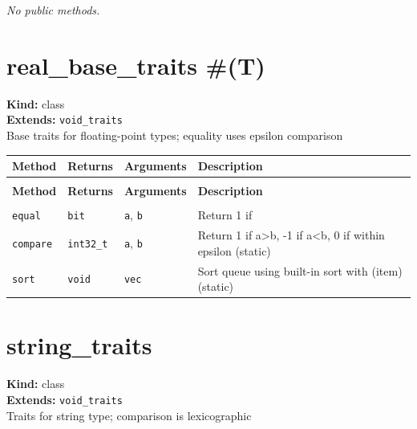 \documentclass[11pt,letterpaper]{report}
\begin{document}
\noindent\textit{No public methods.}


\section{real\_base\_traits \#(T)}
\label{cls:realbasetraitsT}

\noindent\textbf{Kind:} class\\
\noindent\textbf{Extends:} \texttt{void\_traits}\\
\noindent Base traits for floating-point types; equality uses epsilon comparison

\begin{xltabular}{\linewidth}{>{\small}p{1.35in} >{\small}p{1.25in} >{\small}p{0.95in} >{\small}X}
\toprule
\textbf{Method} & \textbf{Returns} & \textbf{Arguments} & \textbf{Description} \\
\midrule
\endfirsthead
{} \\
\midrule
\textbf{Method} & \textbf{Returns} & \textbf{Arguments} & \textbf{Description} \\
\midrule
\endhead
\midrule
{} \\
\endfoot
\bottomrule
\endlastfoot
\texttt{equal} & \texttt{bit} & \texttt{a}, \texttt{b} & Return 1 if \\
\texttt{compare} & \texttt{int32\_t} & \texttt{a}, \texttt{b} & Return 1 if a\textgreater{}b, -1 if a\textless{}b, 0 if within epsilon (static) \\
\texttt{sort} & \texttt{void} & \texttt{vec} & Sort queue using built-in sort with (item) (static) \\
\end{xltabular}

\section{string\_traits}
\label{cls:stringtraits}

\noindent\textbf{Kind:} class\\
\noindent\textbf{Extends:} \texttt{void\_traits}\\
\noindent Traits for string type; comparison is lexicographic
\end{document}
